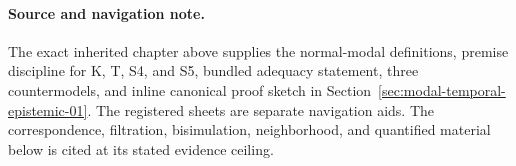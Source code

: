 \paragraph{Source and navigation note.}
The exact inherited chapter above supplies the normal-modal definitions,
premise discipline for K, T, S4, and S5, bundled adequacy statement,
three countermodels, and inline canonical proof sketch in
Section~\ref{sec:modal-temporal-epistemic-01}.  The registered sheets are
separate navigation aids.  The correspondence, filtration, bisimulation,
neighborhood, and quantified material below is cited at its stated evidence
ceiling.
